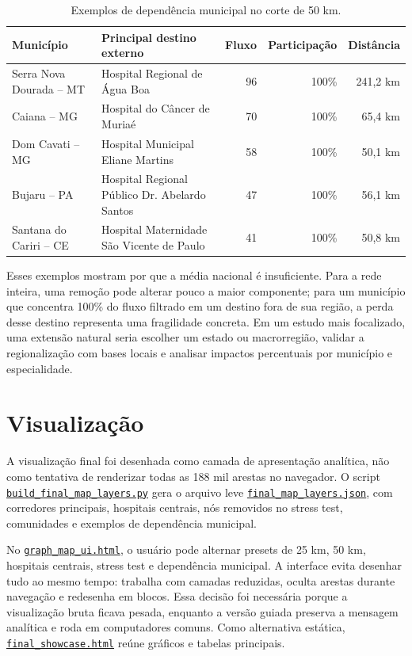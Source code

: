 \documentclass[10pt,a4paper]{article}
\newcommand{\repo}{https://github.com/lcardosott/sus-graph-project}
\newcommand{\repobranch}{gh-pages}
\newcommand{\ghfile}[2]{\href{\repo/blob/\repobranch/#1}{\texttt{#2}}}
\begin{document}
\begin{table}[H]
\centering
\caption{Exemplos de dependência municipal no corte de 50 km.}
\label{tab:dependencia}
\scriptsize
\begin{tabular}{p{3.2cm}p{5.0cm}rrr}
\toprule
Município & Principal destino externo & Fluxo & Participação & Distância \\
\midrule
Serra Nova Dourada -- MT & Hospital Regional de Água Boa & 96 & 100\% & 241,2 km \\
Caiana -- MG & Hospital do Câncer de Muriaé & 70 & 100\% & 65,4 km \\
Dom Cavati -- MG & Hospital Municipal Eliane Martins & 58 & 100\% & 50,1 km \\
Bujaru -- PA & Hospital Regional Público Dr. Abelardo Santos & 47 & 100\% & 56,1 km \\
Santana do Cariri -- CE & Hospital Maternidade São Vicente de Paulo & 41 & 100\% & 50,8 km \\
\bottomrule
\end{tabular}
\end{table}

Esses exemplos mostram por que a média nacional é insuficiente. Para a rede inteira, uma remoção pode alterar pouco a maior componente; para um município que concentra 100\% do fluxo filtrado em um destino fora de sua região, a perda desse destino representa uma fragilidade concreta. Em um estudo mais focalizado, uma extensão natural seria escolher um estado ou macrorregião, validar a regionalização com bases locais e analisar impactos percentuais por município e especialidade.

\section{Visualização}

A visualização final foi desenhada como camada de apresentação analítica, não como tentativa de renderizar todas as 188 mil arestas no navegador. O script \ghfile{viz_layer/build_final_map_layers.py}{build\_final\_map\_layers.py} gera o arquivo leve \ghfile{viz_layer/reports/final_map_layers.json}{final\_map\_layers.json}, com corredores principais, hospitais centrais, nós removidos no stress test, comunidades e exemplos de dependência municipal.

No \ghfile{viz_layer/graph_map_ui.html}{graph\_map\_ui.html}, o usuário pode alternar presets de 25 km, 50 km, hospitais centrais, stress test e dependência municipal. A interface evita desenhar tudo ao mesmo tempo: trabalha com camadas reduzidas, oculta arestas durante navegação e redesenha em blocos. Essa decisão foi necessária porque a visualização bruta ficava pesada, enquanto a versão guiada preserva a mensagem analítica e roda em computadores comuns. Como alternativa estática, \ghfile{viz_layer/reports/final_showcase.html}{final\_showcase.html} reúne gráficos e tabelas principais.
\end{document}
